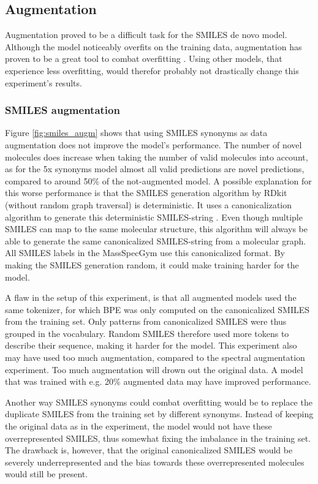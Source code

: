\subsection{Augmentation}

Augmentation proved to be a difficult task for the SMILES de novo model.
Although the model noticeably overfits on the training data, augmentation has proven to be a great tool to combat overfitting \cite{shorten2019survey}.
Using other models, that experience less overfitting, would therefor probably not drastically change this experiment's results.

\subsubsection*{SMILES augmentation}

Figure \ref{fig:smiles_augm} shows that using SMILES synonyms as data augmentation does not improve the model's performance.
The number of novel molecules does increase when taking the number of valid molecules into account, as for the 5x synonyms model almost all valid predictions are novel predictions, compared to around 50\% of the not-augmented model.
A possible explanation for this worse performance is that the SMILES generation algorithm by RDkit (without random graph traversal) is deterministic.
It uses a canonicalization algorithm to generate this deterministic SMILES-string \cite{daylight_smiles_theory}.
Even though multiple SMILES can map to the same molecular structure, this algorithm will always be able to generate the same canonicalized SMILES-string from a molecular graph.
All SMILES labels in the MassSpecGym use this canonicalized format. 
By making the SMILES generation random, it could make training harder for the model.

A flaw in the setup of this experiment, is that all augmented models used the same tokenizer, for which \ac{BPE} was only computed on the canonicalized SMILES from the training set.
Only patterns from canonicalized SMILES were thus grouped in the vocabulary.
Random SMILES therefore used more tokens to describe their sequence, making it harder for the model.
This experiment also may have used too much augmentation, compared to the spectral augmentation experiment.
Too much augmentation will drown out the original data.
A model that was trained with e.g. 20\% augmented data may have improved performance.

Another way SMILES synonyms could combat overfitting would be to replace the duplicate SMILES from the training set by different synonyms.
Instead of keeping the original data as in the experiment, the model would not have these overrepresented SMILES, thus somewhat fixing the imbalance in the training set.
The drawback is, however, that the original canonicalized SMILES would be severely underrepresented and the bias towards these overrepresented molecules would still be present.

